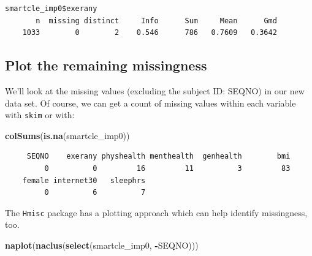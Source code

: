 \documentclass[]{book}
\newenvironment{Shaded}{\begin{snugshade}}{\end{snugshade}}
\newcommand{\KeywordTok}[1]{\textcolor[rgb]{0.13,0.29,0.53}{\textbf{#1}}}
\newcommand{\StringTok}[1]{\textcolor[rgb]{0.31,0.60,0.02}{#1}}
\newcommand{\OperatorTok}[1]{\textcolor[rgb]{0.81,0.36,0.00}{\textbf{#1}}}
\newcommand{\NormalTok}[1]{#1}
\theoremstyle{definition}
\theoremstyle{definition}
\theoremstyle{definition}
\theoremstyle{remark}
\begin{document}
\begin{Shaded}
\end{Shaded}

\begin{verbatim}
smartcle_imp0$exerany 
       n  missing distinct     Info      Sum     Mean      Gmd 
    1033        0        2    0.546      786   0.7609   0.3642 
\end{verbatim}

\subsection{Plot the remaining
missingness}\label{plot-the-remaining-missingness}

We'll look at the missing values (excluding the subject ID: SEQNO) in
our new data set. Of course, we can get a count of missing values within
each variable with \texttt{skim} or with:

\begin{Shaded}
\begin{Highlighting}[]
\KeywordTok{colSums}\NormalTok{(}\KeywordTok{is.na}\NormalTok{(smartcle_imp0))}
\end{Highlighting}
\end{Shaded}

\begin{verbatim}
     SEQNO    exerany physhealth menthealth  genhealth        bmi 
         0          0         16         11          3         83 
    female internet30   sleephrs 
         0          6          7 
\end{verbatim}

The \texttt{Hmisc} package has a plotting approach which can help
identify missingness, too.

\begin{Shaded}
\begin{Highlighting}[]
\KeywordTok{naplot}\NormalTok{(}\KeywordTok{naclus}\NormalTok{(}\KeywordTok{select}\NormalTok{(smartcle_imp0, }\OperatorTok{-}\NormalTok{SEQNO)))}
\end{Highlighting}
\end{Shaded}
\end{document}
